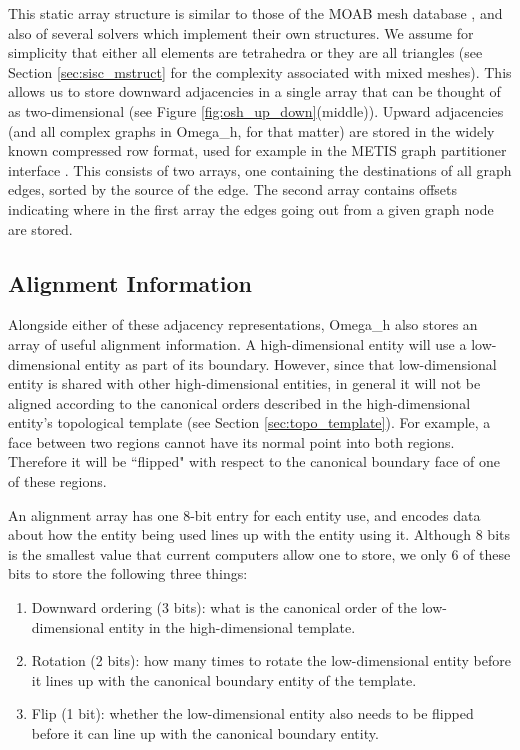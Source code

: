This static array structure is similar to those
of the MOAB mesh database \cite{tautges2004moab},
and also of several solvers which implement their own structures.
We assume for simplicity that either all elements are tetrahedra
or they are all triangles (see Section \ref{sec:sisc_mstruct} for
the complexity associated with mixed meshes).
This allows us to store downward adjacencies in a single array
that can be thought of as two-dimensional
(see Figure \ref{fig:osh_up_down}(middle)).
Upward adjacencies (and all complex graphs in Omega\_h, for that matter)
are stored in the widely known compressed row format,
used for example in the METIS graph partitioner interface \cite{METIS}.
This consists of two arrays, one containing the destinations
of all graph edges, sorted by the source of the edge.
The second array contains offsets indicating where in the first
array the edges going out from a given graph node are stored.

\subsection{Alignment Information}
\label{sec:osh_align}

Alongside either of these adjacency representations, Omega\_h
also stores an array of useful alignment information.
A high-dimensional entity will use a low-dimensional entity
as part of its boundary. However, since that low-dimensional
entity is shared with other high-dimensional entities, in general
it will not be aligned according to the canonical orders
described in the high-dimensional entity's topological
template (see Section \ref{sec:topo_template}).
For example, a face between two regions cannot have its normal
point into both regions.
Therefore it will be ``flipped" with respect to the canonical
boundary face of one of these regions.

An alignment array has one 8-bit entry for each entity use, and encodes
data about how the entity being used lines up with the entity using it.
Although 8 bits is the smallest value that current computers allow one
to store, we only 6 of these bits to store the following three things:
\begin{enumerate}
\item Downward ordering (3 bits): what is the canonical order of the
low-dimensional entity in the high-dimensional template.
\item Rotation (2 bits): how many times to rotate the low-dimensional
entity before it lines up with the canonical boundary
entity of the template.
\item Flip (1 bit): whether the low-dimensional entity also
needs to be flipped before it can line up with the canonical
boundary entity.
\end{enumerate}

